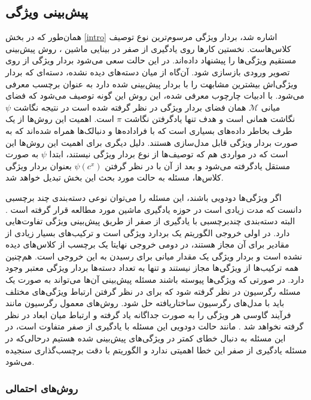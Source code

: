 \subsection{پیش‌بینی ویژگی}
همان‌طور که در بخش \ref{intro} اشاره شد، بردار ویژگی مرسوم‌ترین نوع توصیف کلاس‌هاست. نخستین کارها روی یادگیری از صفر در بینایی ماشین \cite{lampert09, farhadi09}،
روش پیش‌بینی مستقیم ویژگی‌ها را پیشنهاد داده‌اند. در این حالت سعی می‌شود بردار ویژگی از روی تصویر ورودی بازسازی شود. آن‌گاه از میان دسته‌های دیده نشده، دسته‌ای که بردار ویژگی‌اش بیشترین مشابهت را با بردار پیش‌بینی شده دارد به عنوان برچسب معرفی می‌شود. با ادبیات چارچوب معرفی شده، این روش این گونه توصیف می‌شود که فضای میانی  $ \mathcal{M} $ همان فضای بردار ویژگی در نظر گرفته شده است در نتیجه نگاشت $\psi$ نگاشت همانی است و هدف تنها یادگرفتن نگاشت $\pi$ است. اهمیت این روش‌ها از یک طرف بخاطر داده‌های بسیاری است که با فراداده‌ها  و دنبالک‌ها  همراه شده‌اند که به صورت بردار ویژگی قابل مدل‌سازی هستند. دلیل دیگری برای اهمیت این روش‌ها این است که در مواردی هم که توصیف‌ها از نوع بردار ویژگی نیستند، ابتدا $\psi$ به صورت مستقل یادگرفته می‌شود و بعد از آن با در نظر گرفتن   $ \psi(c^x) $ بعنوان بردار ویژگی کلاس‌ها، مسئله به حالت مورد بحث این بخش تبدیل خواهد شد.  

 
 اگر ویژگی‌ها دودویی باشند، این مسئله را می‌توان نوعی دسته‌بندی چند برچسبی  دانست که مدت زیادی است در حوزه یادگیری ماشین مورد مطالعه قرار گرفته است \cite{multilabel}. البته دسته‌بندی چندبرچسبی با یادگیری از صفر از طریق پیش‌بینی ویژگی تفاوت‌هایی دارد. در اولی خروجی الگوریتم یک بردارد ویژگی است و ترکیب‌های بسیار زیادی از مقادیر برای آن مجاز هستند، در دومی خروجی نهایتا یک برچسب از کلاس‌های دیده نشده است و بردار ویژگی یک مقدار میانی برای رسیدن به این خروجی است. هم‌چنین همه ترکیب‌ها از ویژگی‌ها مجاز نیستند و تنها به تعداد دسته‌ها بردار ویژگی معتبر وجود دارد. در صورتی که ویژگی‌ها پیوسته باشند مسئله پیش‌بینی آن‌ها می‌تواند به صورت یک مسئله رگرسیون در نظر گرفته شود که برای در نظر گرفتن ارتباط ویژگی‌های مختلف باید با مدل‌های 
 رگرسیون ساختاریافته  \cite{elements} حل شود. روش‌های معمول رگرسیون مانند فرآیند گاوسی هر ویژگی را به صورت جداگانه یاد گرفته و ارتباط میان ابعاد در نظر گرفته نخواهد شد \cite{mohamed13}. مانند حالت دودویی این مسئله با یادگیری از صفر متفاوت است، در این مسئله به دنبال خطای کمتر در ویژگی‌های پیش‌بینی شده هستیم درحالی‌که در مسئله یادگیری از صفر این خطا اهمیتی ندارد و الگوریتم با دقت برچسب‌گذاری سنجیده می‌شود. 
\subsubsection{روش‌های احتمالی}\label{prob}

